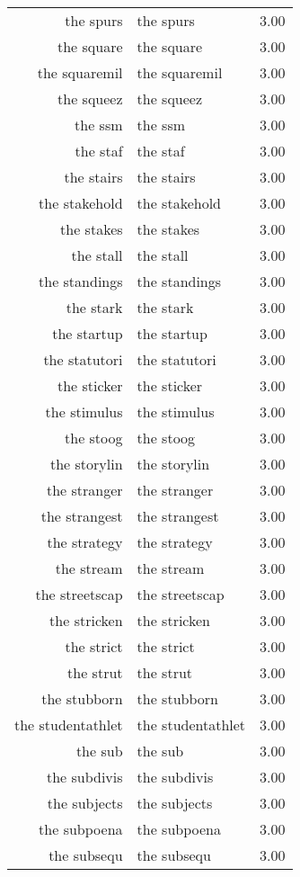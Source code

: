 \begin{table}[ht]
\begin{tabular}{rlr}
  the spurs & the spurs & 3.00 \\ 
  the square & the square & 3.00 \\ 
  the squaremil & the squaremil & 3.00 \\ 
  the squeez & the squeez & 3.00 \\ 
  the ssm & the ssm & 3.00 \\ 
  the staf & the staf & 3.00 \\ 
  the stairs & the stairs & 3.00 \\ 
  the stakehold & the stakehold & 3.00 \\ 
  the stakes & the stakes & 3.00 \\ 
  the stall & the stall & 3.00 \\ 
  the standings & the standings & 3.00 \\ 
  the stark & the stark & 3.00 \\ 
  the startup & the startup & 3.00 \\ 
  the statutori & the statutori & 3.00 \\ 
  the sticker & the sticker & 3.00 \\ 
  the stimulus & the stimulus & 3.00 \\ 
  the stoog & the stoog & 3.00 \\ 
  the storylin & the storylin & 3.00 \\ 
  the stranger & the stranger & 3.00 \\ 
  the strangest & the strangest & 3.00 \\ 
  the strategy & the strategy & 3.00 \\ 
  the stream & the stream & 3.00 \\ 
  the streetscap & the streetscap & 3.00 \\ 
  the stricken & the stricken & 3.00 \\ 
  the strict & the strict & 3.00 \\ 
  the strut & the strut & 3.00 \\ 
  the stubborn & the stubborn & 3.00 \\ 
  the studentathlet & the studentathlet & 3.00 \\ 
  the sub & the sub & 3.00 \\ 
  the subdivis & the subdivis & 3.00 \\ 
  the subjects & the subjects & 3.00 \\ 
  the subpoena & the subpoena & 3.00 \\ 
  the subsequ & the subsequ & 3.00 \\ 

\end{tabular}
\end{table}
